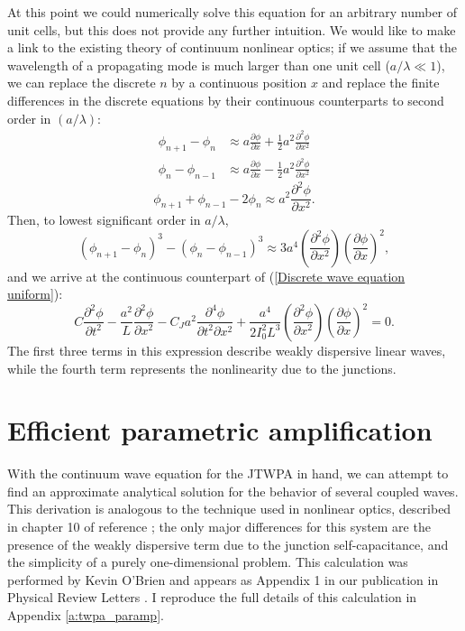 At this point we could numerically solve this equation for an arbitrary number of unit cells, but this does not provide any further intuition.  We would like to make a link to the existing theory of continuum nonlinear optics; if we assume that the wavelength of a propagating mode is much larger than one unit cell ($a/\lambda \ll 1$), we can replace the discrete $n$ by a continuous position $x$ and replace the finite differences in the discrete equations by their continuous counterparts to second order in $(a/\lambda)$: 
\begin{align}
\phi_{n+1}-\phi_{n} &\approx a\frac{\partial \phi}{\partial x}+\frac{1}{2}a^{2}\frac{\partial ^{2} \phi}{\partial x^{2}} \\
\phi_{n}-\phi_{n-1} &\approx a\frac{\partial \phi}{\partial x}-\frac{1}{2}a^{2}\frac{\partial ^{2}\phi}{\partial x^{2}}
\end{align}
\begin{equation}
\phi_{n+1}+\phi_{n-1} -2\phi_{n} \approx a^{2}\frac{\partial ^{2}\phi}{\partial x^{2}}.
\end{equation}
Then, to lowest significant order in $a/\lambda$,
\begin{equation}
\left( \phi_{n+1}-\phi_{n}\right) ^{3}-\left( \phi_{n}-\phi_{n-1}\right) ^{3}\approx 3a^{4}\left( \frac{\partial ^{2}\phi}{\partial x^{2}}\right) \left( \frac{\partial \phi}{\partial x}\right) ^{2},
\end{equation}
and we arrive at the continuous counterpart of (\ref{Discrete wave equation uniform}):
\begin{equation}
C\frac{\partial ^{2}\phi}{\partial t^{2}}-\frac{a^{2}}{L} \frac{\partial ^{2}\phi}{\partial x^{2}}-C_{J}a^{2}\frac{\partial ^{4}\phi}{\partial t^{2}\partial x^{2}}+\frac{a^{4}}{2I_{0}^{2}L^{3}}\left( \frac{\partial^{2}\phi}{\partial x^{2}}\right) \left( \frac{\partial \phi}{\partial x}\right)^{2}=0.
\end{equation}
The first three terms in this expression describe weakly dispersive linear waves, while the fourth term represents the nonlinearity due to the junctions.

\section{Efficient parametric amplification}

With the continuum wave equation for the JTWPA in hand, we can attempt to find an approximate analytical solution for the behavior of several coupled waves.  This derivation is analogous to the technique used in nonlinear optics, described in chapter 10 of reference \cite{Agrawal2012}; the only major differences for this system are the presence of the weakly dispersive term due to the junction self-capacitance, and the simplicity of a purely one-dimensional problem.  This calculation was performed by Kevin O'Brien and appears as Appendix 1 in our publication in Physical Review Letters \cite{OBrien2014}.  I reproduce the full details of this calculation in Appendix \ref{a:twpa_paramp}.

